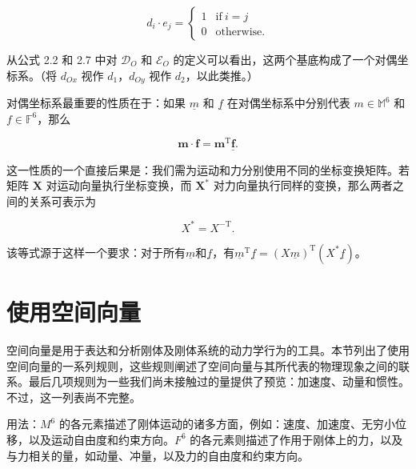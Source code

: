 \documentclass[10pt,a4paper]{book}
\theoremstyle{thmstyle} %
\theoremstyle{defstyle} %
\theoremstyle{prostyle} %
\begin{document}
$$
d _ { i } \cdot e _ { j } = \left\{ \begin{array}{ll} { 1 } & { \mathrm { i f ~ } i = j } \\{ 0 } & { \mathrm { o t h e r w i s e } . } \end{array} \right.
$$



从公式 2.2 和 2.7 中对 $\mathcal{D}_O$ 和 $\mathcal{E}_O$ 的定义可以看出，这两个基底构成了一个对偶坐标系。（将 $d_{Ox}$ 视作 $d_1$，$d_{Oy}$ 视作 $d_2$，以此类推。）



对偶坐标系最重要的性质在于：如果 $\underline{m}$ 和 $\underline{f}$ 在对偶坐标系中分别代表 $m \in \mathbb{M}^{6}$ 和 $f \in \mathbb{F}^{6}$，那么



$$
\boldsymbol { m } \cdot \boldsymbol { f } = \boldsymbol { m } ^{\mathrm { T} } \boldsymbol { \underline { { f } } } .
$$



这一性质的一个直接后果是：我们需为运动和力分别使用不同的坐标变换矩阵。若矩阵 $\mathbf{X}$ 对运动向量执行坐标变换，而 $\mathbf{X}^*$ 对力向量执行同样的变换，那么两者之间的关系可表示为



$$
X ^{*} = X ^{- \mathrm { T} } .
$$



该等式源于这样一个要求：对于所有$\underline{m}$和$\underline{f}$，有$\underline{m}^{\mathrm{T}}\underline{f}=(X\underline{m})^{\mathrm{T}}(X^{*}\underline{f})$。



\section{使用空间向量}





空间向量是用于表达和分析刚体及刚体系统的动力学行为的工具。本节列出了使用空间向量的一系列规则，这些规则阐述了空间向量与其所代表的物理现象之间的联系。最后几项规则为一些我们尚未接触过的量提供了预览：加速度、动量和惯性。不过，这一列表尚不完整。



用法：$M^{6}$ 的各元素描述了刚体运动的诸多方面，例如：速度、加速度、无穷小位移，以及运动自由度和约束方向。$F^{6}$ 的各元素则描述了作用于刚体上的力，以及与力相关的量，如动量、冲量，以及力的自由度和约束方向。
\end{document}
